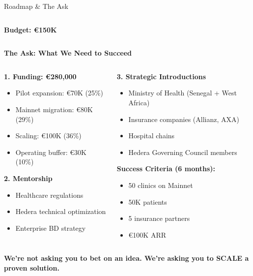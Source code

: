 \documentclass[aspectratio=169,xcolor=dvipsnames,14pt]{beamer}
\newcommand{\checkitem}{\item[\color{SuccessGreen}\faCheckCircle]}
\begin{document}
\begin{frame}{Roadmap \& The Ask}
\begin{columns}[T]
\begin{column}{0.33\textwidth}
      \textbf{Budget: €150K}
    \end{column}
  \end{columns}

  \vspace{0.5cm}

  \textbf{\textcolor{HederaPurple}{The Ask: What We Need to Succeed}}

  \begin{columns}[T]
    \begin{column}{0.5\textwidth}
      \textbf{1. Funding: €280,000}
      \begin{itemize}
        \item Pilot expansion: €70K (25\%)
        \item Mainnet migration: €80K (29\%)
        \item Scaling: €100K (36\%)
        \item Operating buffer: €30K (10\%)
      \end{itemize}

      \vspace{0.2cm}

      \textbf{2. Mentorship}
      \begin{itemize}
        \item Healthcare regulations
        \item Hedera technical optimization
        \item Enterprise BD strategy
      \end{itemize}
    \end{column}

    \begin{column}{0.5\textwidth}
      \textbf{3. Strategic Introductions}
      \begin{itemize}
        \item Ministry of Health (Senegal + West Africa)
        \item Insurance companies (Allianz, AXA)
        \item Hospital chains
        \item Hedera Governing Council members
      \end{itemize}

      \vspace{0.2cm}

      \textbf{Success Criteria (6 months):}
      \begin{itemize}
        \checkitem 50 clinics on Mainnet
        \checkitem 50K patients
        \checkitem 5 insurance partners
        \checkitem €100K ARR
      \end{itemize}
    \end{column}
  \end{columns}

  \vspace{0.3cm}

  \begin{center}
    \Large{\textbf{We're not asking you to bet on an idea. We're asking you to SCALE a proven solution.}}
  \end{center}

\end{frame}
\end{document}
